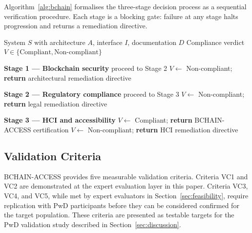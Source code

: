\documentclass[journal,onecolumn]{IEEEtran}
\begin{document}
Algorithm~\ref{alg:bchain} formalises the three-stage decision process as a sequential verification procedure. Each stage is a blocking gate: failure at any stage halts progression and returns a remediation directive.

\begin{algorithm}
\caption{BCHAIN-ACCESS three-stage compliance verification}
\label{alg:bchain}
\begin{algorithmic}[1]
\Require System $S$ with architecture $A$, interface $I$, documentation $D$
\Ensure Compliance verdict $V \in \{\text{Compliant},\text{Non-compliant}\}$

\State \textbf{Stage 1 --- Blockchain security}
    \State proceed to Stage 2
\Else
    \State $V \leftarrow$ Non-compliant; \textbf{return} architectural remediation directive
\EndIf

\State \textbf{Stage 2 --- Regulatory compliance}
    \State proceed to Stage 3
\Else
    \State $V \leftarrow$ Non-compliant; \textbf{return} legal remediation directive
\EndIf

\State \textbf{Stage 3 --- HCI and accessibility}
    \State $V \leftarrow$ Compliant; \textbf{return} BCHAIN-ACCESS certification
\Else
    \State $V \leftarrow$ Non-compliant; \textbf{return} HCI remediation directive
\EndIf
\end{algorithmic}
\end{algorithm}

\subsection{Validation Criteria}
\label{sec:validation-criteria}

BCHAIN-ACCESS provides five measurable validation criteria. Criteria VC1 and VC2 are demonstrated at the expert evaluation layer in this paper. Criteria VC3, VC4, and VC5, while met by expert evaluators in Section~\ref{sec:feasibility}, require replication with PwD participants before they can be considered confirmed for the target population. These criteria are presented as testable targets for the PwD validation study described in Section~\ref{sec:discussion}.
\end{document}
